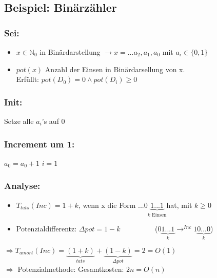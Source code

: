 \documentclass[10pt,a4paper]{article}
\begin{document}
\subsection*{Beispiel: Binärzähler}
\subsubsection*{Sei:}
\begin{itemize}
    \item $x \in \mathbb{N}_0$ in Binärdarstellung $ \rightarrow x=...a_2,a_1,a_0$ mit $a_i \in \{0,1\}$
    \item $pot(x)$ Anzahl der Einsen in Binärdarsellung von x.\\
    Erfüllt: $pot(D_0) = 0 \wedge pot(D_i) \geq 0$
\end{itemize}
\subsubsection*{Init:}
Setze alle $a_i$'s auf 0
\subsubsection*{Increment um 1:}
\begin{algorithm}[H]
$a_0 = a_0+1$\;
$i = 1$\;
\end{algorithm}

\subsubsection*{Analyse:}
\begin{itemize}
    \item $T_{tats}(Inc) = 1+k$, wenn x die Form $...0\underbrace{1...1}_{k\text{ Einsen}}$hat, mit $k \geq 0$
    \item Potenzialdifferentz: $\Delta pot = 1-k$ \ \ \ \ \ \ \ \ \  ($0\underbrace{1...1}_{k} \rightarrow^{Inc} 1\underbrace{0...0}_{k}$)
\end{itemize}
$\Rightarrow T_{amort}(Inc) = \underbrace{(1+k)}_{tats} + \underbrace{(1-k)}_{\Delta pot} = 2 = O(1)$\\
$\Rightarrow$ Potenzialmethode: Gesamtkosten: $2n=O(n)$

\end{document}
